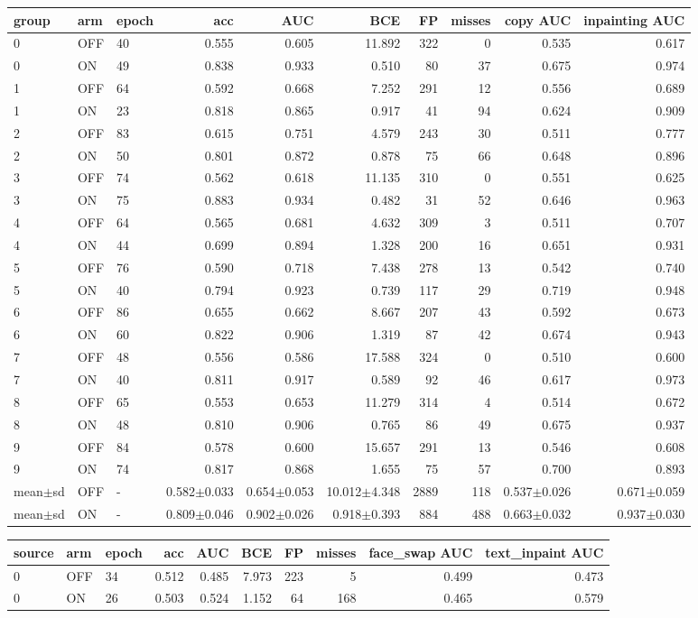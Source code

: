 \begin{tabular}{lllrrrrrrr}
\toprule
group & arm & epoch & acc & AUC & BCE & FP & misses & copy AUC & inpainting AUC \\
\midrule
0 & OFF & 40 & 0.555 & 0.605 & 11.892 & 322 & 0 & 0.535 & 0.617 \\
0 & ON & 49 & 0.838 & 0.933 & 0.510 & 80 & 37 & 0.675 & 0.974 \\
1 & OFF & 64 & 0.592 & 0.668 & 7.252 & 291 & 12 & 0.556 & 0.689 \\
1 & ON & 23 & 0.818 & 0.865 & 0.917 & 41 & 94 & 0.624 & 0.909 \\
2 & OFF & 83 & 0.615 & 0.751 & 4.579 & 243 & 30 & 0.511 & 0.777 \\
2 & ON & 50 & 0.801 & 0.872 & 0.878 & 75 & 66 & 0.648 & 0.896 \\
3 & OFF & 74 & 0.562 & 0.618 & 11.135 & 310 & 0 & 0.551 & 0.625 \\
3 & ON & 75 & 0.883 & 0.934 & 0.482 & 31 & 52 & 0.646 & 0.963 \\
4 & OFF & 64 & 0.565 & 0.681 & 4.632 & 309 & 3 & 0.511 & 0.707 \\
4 & ON & 44 & 0.699 & 0.894 & 1.328 & 200 & 16 & 0.651 & 0.931 \\
5 & OFF & 76 & 0.590 & 0.718 & 7.438 & 278 & 13 & 0.542 & 0.740 \\
5 & ON & 40 & 0.794 & 0.923 & 0.739 & 117 & 29 & 0.719 & 0.948 \\
6 & OFF & 86 & 0.655 & 0.662 & 8.667 & 207 & 43 & 0.592 & 0.673 \\
6 & ON & 60 & 0.822 & 0.906 & 1.319 & 87 & 42 & 0.674 & 0.943 \\
7 & OFF & 48 & 0.556 & 0.586 & 17.588 & 324 & 0 & 0.510 & 0.600 \\
7 & ON & 40 & 0.811 & 0.917 & 0.589 & 92 & 46 & 0.617 & 0.973 \\
8 & OFF & 65 & 0.553 & 0.653 & 11.279 & 314 & 4 & 0.514 & 0.672 \\
8 & ON & 48 & 0.810 & 0.906 & 0.765 & 86 & 49 & 0.675 & 0.937 \\
9 & OFF & 84 & 0.578 & 0.600 & 15.657 & 291 & 13 & 0.546 & 0.608 \\
9 & ON & 74 & 0.817 & 0.868 & 1.655 & 75 & 57 & 0.700 & 0.893 \\
mean$\pm$sd & OFF & - & 0.582$\pm$0.033 & 0.654$\pm$0.053 & 10.012$\pm$4.348 & 2889 & 118 & 0.537$\pm$0.026 & 0.671$\pm$0.059 \\
mean$\pm$sd & ON & - & 0.809$\pm$0.046 & 0.902$\pm$0.026 & 0.918$\pm$0.393 & 884 & 488 & 0.663$\pm$0.032 & 0.937$\pm$0.030 \\
\bottomrule
\end{tabular}

\begin{tabular}{lllrrrrrrr}
\toprule
source & arm & epoch & acc & AUC & BCE & FP & misses & face_swap AUC & text_inpaint AUC \\
\midrule
0 & OFF & 34 & 0.512 & 0.485 & 7.973 & 223 & 5 & 0.499 & 0.473 \\
0 & ON & 26 & 0.503 & 0.524 & 1.152 & 64 & 168 & 0.465 & 0.579 \\
\bottomrule
\end{tabular}
